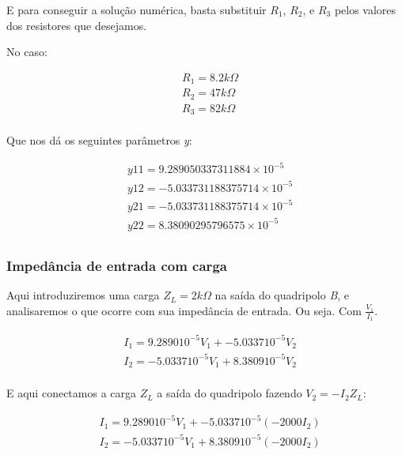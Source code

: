 \documentclass[12pt,twoside, a4paper, twocolumn]{article}
\begin{document}
E para conseguir a solução numérica, basta substituir $R_1$, $R_2$, e $R_3$ pelos valores dos resistores que desejamos.


No caso:


\begin{equation}
    \begin{aligned}
         & R_1 = 8.2k \varOmega \\
         & R_2 = 47k \varOmega  \\
         & R_3 = 82k \varOmega  \\
    \end{aligned}
\end{equation}


Que nos dá os seguintes parâmetros \emph{y}:


\begin{equation}
    \begin{aligned}
         & y11 = 9.289050337311884 \times 10^{-5}  \\
         & y12 = -5.033731188375714 \times 10^{-5} \\
         & y21 = -5.033731188375714 \times 10^{-5} \\
         & y22 = 8.38090295796575 \times 10^{-5}   \\
    \end{aligned}
\end{equation}


\subsubsection{Impedância de  entrada com carga}


Aqui introduziremos uma carga $Z_L = 2k \varOmega$ na saída do quadripolo \emph{B}, e analisaremos o que ocorre com sua impedância de entrada. Ou seja. Com $\frac{V_1}{I_1}.$


\begin{equation}
    \begin{aligned}
         & I_1 = 9.2890 10^{-5} V_1 + -5.0337 10^{-5} V_2 \\
         & I_2 = -5.0337 10^{-5} V_1 + 8.3809 10^{-5} V_2 \\
    \end{aligned}
\end{equation}


E aqui conectamos a carga $Z_L$ a saída do quadripolo fazendo $V_2 = -I_2 Z_L$:


\begin{equation}
    \begin{aligned}
         & I_1 = 9.2890 10^{-5} V_1 + -5.0337 10^{-5}  (-2000 I_2) \\
         & I_2 = -5.0337 10^{-5} V_1 + 8.3809 10^{-5} (-2000 I_2)  \\
    \end{aligned}
\end{equation}
\end{document}
